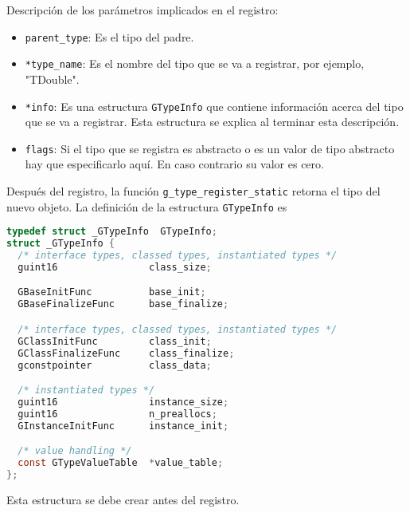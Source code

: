 \newpage
Descripción de los parámetros implicados en el registro:
\begin{itemize}
  \tightlist
\item \texttt{parent\_type}: Es el tipo del padre.
\item \texttt{*type\_name}: Es el nombre del tipo que se va a registrar,
  por ejemplo, "\textsf{TDouble}".
\item \texttt{*info}: Es una estructura \texttt{GTypeInfo} que contiene información acerca
  del tipo que se va a registrar. Esta estructura se explica al terminar esta descripción.
\item \texttt{flags}: Si el tipo que se registra es abstracto o es un valor de tipo
  abstracto\footnotemark{} hay que especificarlo aquí. En caso contrario su valor es cero.
\end{itemize}
Después del registro, la función \texttt{g\_type\_register\_static} retorna
el tipo del nuevo objeto. La definición de la estructura \texttt{GTypeInfo} es
\begin{lstlisting}[language=C]
typedef struct _GTypeInfo  GTypeInfo;
struct _GTypeInfo {
  /* interface types, classed types, instantiated types */
  guint16                class_size;

  GBaseInitFunc          base_init;
  GBaseFinalizeFunc      base_finalize;

  /* interface types, classed types, instantiated types */
  GClassInitFunc         class_init;
  GClassFinalizeFunc     class_finalize;
  gconstpointer          class_data;

  /* instantiated types */
  guint16                instance_size;
  guint16                n_preallocs;
  GInstanceInitFunc      instance_init;

  /* value handling */
  const GTypeValueTable  *value_table;
};
\end{lstlisting}

Esta estructura se debe crear antes del registro.

